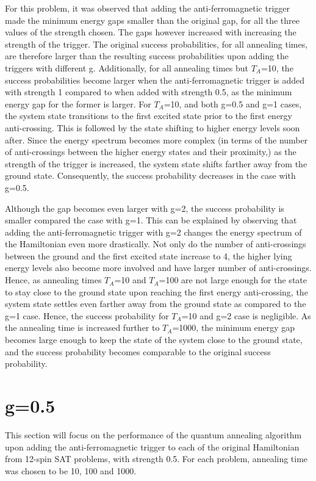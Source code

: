 \documentclass[12]{article}
\begin{document}
For this problem, it was observed that adding the anti-ferromagnetic trigger made the minimum energy gaps smaller than the original gap, for all the three values of the strength chosen. The gaps however increased with increasing the strength of the trigger. The original success probabilities, for all annealing times, are therefore larger than the resulting success probabilities upon adding the triggers with different g. Additionally, for all annealing times but $T_A$=10, the success probabilities become larger when the anti-ferromagnetic trigger is added with strength 1 compared to when added with strength 0.5, as the minimum energy gap for the former is larger. For $T_A$=10, and both g=0.5 and g=1 cases, the system state transitions to the first excited state prior to the first energy anti-crossing. This is followed by the state shifting to higher energy levels soon after. Since the energy spectrum becomes more complex (in terms of the number of anti-crossings between the higher energy states and their proximity,) as the strength of the trigger is increased, the system state shifts farther away from the ground state. Consequently, the success probability decreases in the case with g=0.5.

 Although the gap becomes even larger with g=2, the success probability is smaller compared the case with g=1. This can be explained by observing that adding the anti-ferromagnetic trigger with g=2 changes the energy spectrum of the Hamiltonian even more drastically. Not only do the number of anti-crossings between the ground and the first excited state increase to 4, the higher lying energy levels also become more involved and have larger number of anti-crossings. Hence, as annealing times $T_A$=10 and $T_A$=100 are not large enough for the state to stay close to the ground state upon reaching the first energy anti-crossing, the system state settles even farther away from the ground state as compared to the g=1 case. Hence, the success probability for $T_A$=10 and g=2 case is negligible. As the annealing time is increased further to $T_A$=1000, the minimum energy gap becomes large enough to keep the state of the system close to the ground state, and the success probability becomes comparable to the original success probability.
 
 
\section*{g=0.5}
This section will focus on the performance of the quantum annealing algorithm upon adding the anti-ferromagnetic trigger to each of the original Hamiltonian from 12-spin SAT problems, with strength 0.5. For each problem, annealing time was chosen to be 10, 100 and 1000. 
\end{document}
